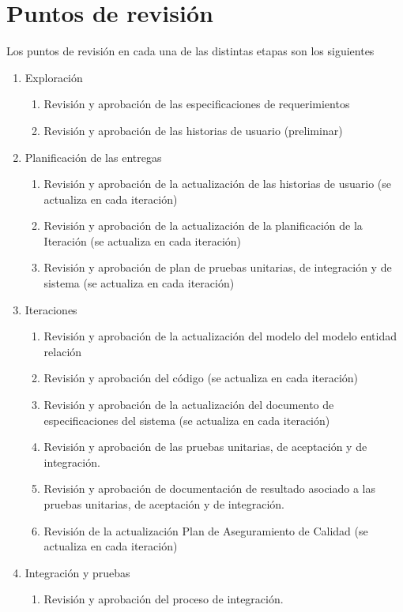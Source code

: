 \section{Puntos de revisión}
Los puntos de revisión en cada una de las distintas etapas son los siguientes 
\begin{enumerate}
	\item Exploración
	\begin{enumerate}
		\item Revisión y aprobación de las especificaciones de requerimientos
		\item Revisión y aprobación de las historias de usuario (preliminar)
	\end{enumerate}
	\item Planificación de las entregas
	\begin{enumerate}
		\item Revisión y aprobación de la actualización de las historias de usuario (se actualiza en cada iteración)
		\item Revisión y aprobación de la actualización de la planificación de la Iteración (se actualiza en cada iteración)
		\item Revisión y aprobación de plan de pruebas unitarias, de integración y de sistema (se actualiza en cada iteración)
	\end{enumerate} 
	\item Iteraciones
	\begin{enumerate}
		\item Revisión y aprobación de la actualización del modelo del modelo entidad relación
		\item Revisión y aprobación del código (se actualiza en cada iteración)
		\item Revisión y aprobación de la actualización del documento de especificaciones del sistema (se actualiza en cada iteración)
		\item Revisión y aprobación de las pruebas unitarias, de aceptación y de integración.
		\item Revisión y aprobación de documentación de resultado asociado a las pruebas unitarias, de aceptación y de integración. 
		\item Revisión de la actualización Plan de Aseguramiento de Calidad (se actualiza en cada iteración)
	\end{enumerate} 	
	\item Integración y pruebas
	\begin{enumerate} 
		\item Revisión y aprobación del proceso de integración.

\end{enumerate}
\end{enumerate}
